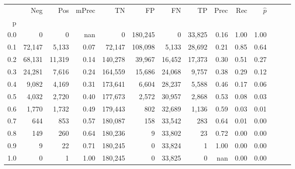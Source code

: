 \begin{tabular}{rrrrrrrrrrrrrr}
\toprule
{} &     Neg &     Pos & mPrec &       TN &       FP &      FN &      TP &  Prec &   Rec & $\hat{p}$ \\
p   &         &         &       &          &          &         &         &       &       &           \\
\midrule
0.0 &       0 &       0 &   nan &        0 &  180,245 &       0 &  33,825 &  0.16 &  1.00 &      1.00 \\
0.1 &  72,147 &   5,133 &  0.07 &   72,147 &  108,098 &   5,133 &  28,692 &  0.21 &  0.85 &      0.64 \\
0.2 &  68,131 &  11,319 &  0.14 &  140,278 &   39,967 &  16,452 &  17,373 &  0.30 &  0.51 &      0.27 \\
0.3 &  24,281 &   7,616 &  0.24 &  164,559 &   15,686 &  24,068 &   9,757 &  0.38 &  0.29 &      0.12 \\
0.4 &   9,082 &   4,169 &  0.31 &  173,641 &    6,604 &  28,237 &   5,588 &  0.46 &  0.17 &      0.06 \\
0.5 &   4,032 &   2,720 &  0.40 &  177,673 &    2,572 &  30,957 &   2,868 &  0.53 &  0.08 &      0.03 \\
0.6 &   1,770 &   1,732 &  0.49 &  179,443 &      802 &  32,689 &   1,136 &  0.59 &  0.03 &      0.01 \\
0.7 &     644 &     853 &  0.57 &  180,087 &      158 &  33,542 &     283 &  0.64 &  0.01 &      0.00 \\
0.8 &     149 &     260 &  0.64 &  180,236 &        9 &  33,802 &      23 &  0.72 &  0.00 &      0.00 \\
0.9 &       9 &      22 &  0.71 &  180,245 &        0 &  33,824 &       1 &  1.00 &  0.00 &      0.00 \\
1.0 &       0 &       1 &  1.00 &  180,245 &        0 &  33,825 &       0 &   nan &  0.00 &      0.00 \\
\bottomrule
\end{tabular}
